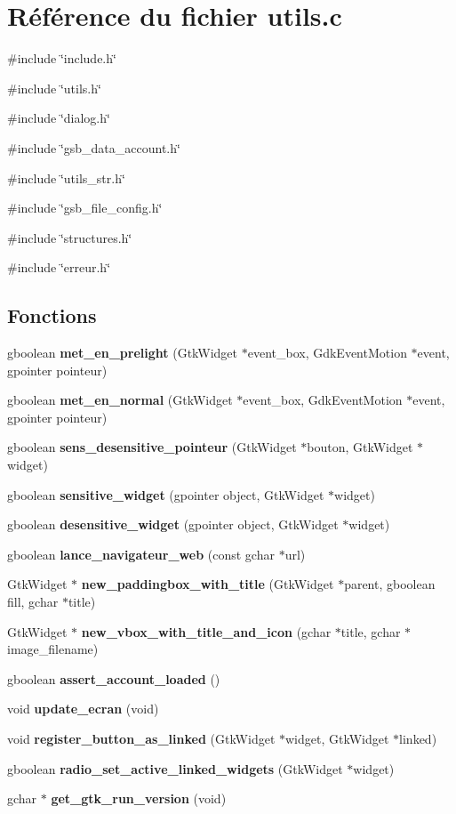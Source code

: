 \section{Référence du fichier utils.c}
\label{utils_8c}
{\ttfamily \#include \char`\"{}include.h\char`\"{}}\par
{\ttfamily \#include \char`\"{}utils.h\char`\"{}}\par
{\ttfamily \#include \char`\"{}dialog.h\char`\"{}}\par
{\ttfamily \#include \char`\"{}gsb\_\-data\_\-account.h\char`\"{}}\par
{\ttfamily \#include \char`\"{}utils\_\-str.h\char`\"{}}\par
{\ttfamily \#include \char`\"{}gsb\_\-file\_\-config.h\char`\"{}}\par
{\ttfamily \#include \char`\"{}structures.h\char`\"{}}\par
{\ttfamily \#include \char`\"{}erreur.h\char`\"{}}\par
\subsection*{Fonctions}
\begin{DoxyCompactItemize}
\item 
gboolean {\bf met\_\-en\_\-prelight} (GtkWidget $\ast$event\_\-box, GdkEventMotion $\ast$event, gpointer pointeur)
\item 
gboolean {\bf met\_\-en\_\-normal} (GtkWidget $\ast$event\_\-box, GdkEventMotion $\ast$event, gpointer pointeur)
\item 
gboolean {\bf sens\_\-desensitive\_\-pointeur} (GtkWidget $\ast$bouton, GtkWidget $\ast$widget)
\item 
gboolean {\bf sensitive\_\-widget} (gpointer object, GtkWidget $\ast$widget)
\item 
gboolean {\bf desensitive\_\-widget} (gpointer object, GtkWidget $\ast$widget)
\item 
gboolean {\bf lance\_\-navigateur\_\-web} (const gchar $\ast$url)
\item 
GtkWidget $\ast$ {\bf new\_\-paddingbox\_\-with\_\-title} (GtkWidget $\ast$parent, gboolean fill, gchar $\ast$title)
\item 
GtkWidget $\ast$ {\bf new\_\-vbox\_\-with\_\-title\_\-and\_\-icon} (gchar $\ast$title, gchar $\ast$image\_\-filename)
\item 
gboolean {\bf assert\_\-account\_\-loaded} ()
\item 
void {\bf update\_\-ecran} (void)
\item 
void {\bf register\_\-button\_\-as\_\-linked} (GtkWidget $\ast$widget, GtkWidget $\ast$linked)
\item 
gboolean {\bf radio\_\-set\_\-active\_\-linked\_\-widgets} (GtkWidget $\ast$widget)
\item 
gchar $\ast$ {\bf get\_\-gtk\_\-run\_\-version} (void)
\end{DoxyCompactItemize}
